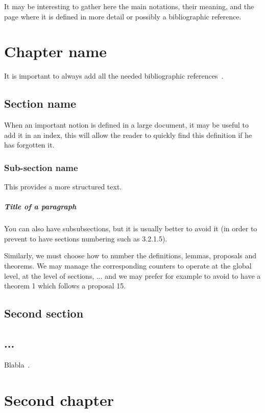 \documentclass[11pt,a4paper,oneside]{book}
\begin{document}
It may be interesting to gather here the main notations, their meaning, and the page where it is defined in more detail or possibly a bibliographic reference.

\chapter{Chapter name}

It is important to always add all the needed bibliographic references~\cite{ref1,ref3}.

\section{Section name}

When an important notion is defined in a large document, it may be useful to add it in an index, this will allow the reader to quickly find this definition if he has forgotten it.

\subsection{Sub-section name}

This provides a more structured text.

\paragraph{Title of a paragraph}

You can also have subsubsections, but it is usually better to avoid it (in order to prevent to have  sections numbering such as 3.2.1.5).

Similarly, we must choose how to number the definitions, lemmas, proposals and theorems. We may manage the corresponding counters to operate at the global level, at the level of sections, ... and we may prefer for example to avoid to have a theorem 1 which follows a proposal 15.

\section{Second section}

\section{...}Blabla~\cite{ref2}.

\chapter{Second chapter}
\end{document}
